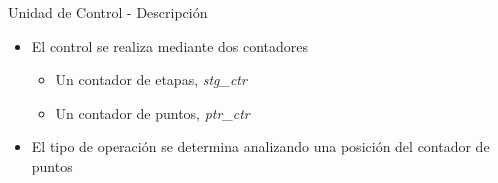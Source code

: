 \begin{frame}{Unidad de Control - Descripción}
  \begin{itemize}
    \item<1-> El control se realiza mediante dos contadores
    \begin{itemize}
      \item<2-> Un contador de etapas, \textit{stg\_ctr}
      \item<3-> Un contador de puntos, \textit{ptr\_ctr}
    \end{itemize}  
    \item<4-> El tipo de operación se determina analizando una posición del contador de
    puntos 
\end{itemize}
\end{frame}
